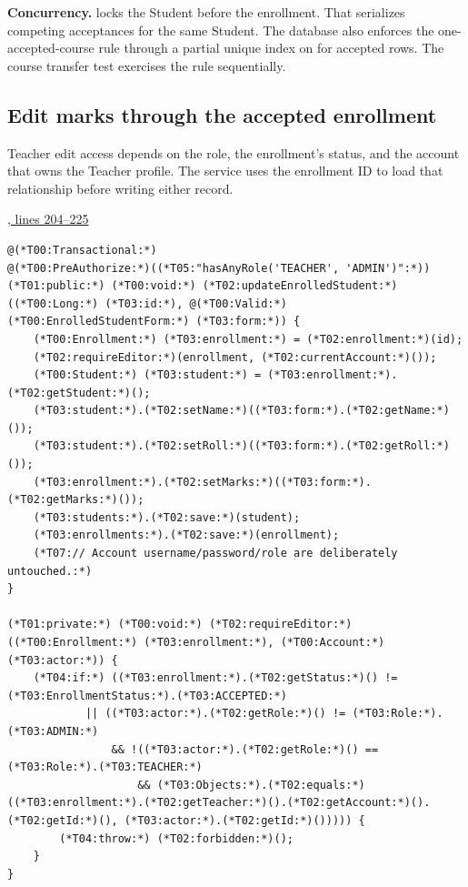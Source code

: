 \textbf{Concurrency.}
 locks the Student before the enrollment. That serializes
competing acceptances for the same Student. The database also enforces the
one-accepted-course rule through a partial unique index on  for
accepted rows. The course transfer test exercises the rule sequentially.

\clearpage
\subsection{Edit marks through the accepted enrollment}
Teacher edit access depends on the role, the enrollment's status, and the
account that owns the Teacher profile. The service uses the enrollment ID to
load that relationship before writing either record.

\par\smallskip
{\small\href{\repo/blob/5d22aed7f6d4ef1e4c0b0c0dabf2962ba4b47608/src/main/java/com/example/fmschool/service/EnrollmentService.java#L204-L225}{, lines 204--225}}
\begin{lstlisting}[style=vsJava,firstnumber=204]
@(*T00:Transactional:*)
@(*T00:PreAuthorize:*)((*T05:"hasAnyRole('TEACHER', 'ADMIN')":*))
(*T01:public:*) (*T00:void:*) (*T02:updateEnrolledStudent:*)((*T00:Long:*) (*T03:id:*), @(*T00:Valid:*) (*T00:EnrolledStudentForm:*) (*T03:form:*)) {
    (*T00:Enrollment:*) (*T03:enrollment:*) = (*T02:enrollment:*)(id);
    (*T02:requireEditor:*)(enrollment, (*T02:currentAccount:*)());
    (*T00:Student:*) (*T03:student:*) = (*T03:enrollment:*).(*T02:getStudent:*)();
    (*T03:student:*).(*T02:setName:*)((*T03:form:*).(*T02:getName:*)());
    (*T03:student:*).(*T02:setRoll:*)((*T03:form:*).(*T02:getRoll:*)());
    (*T03:enrollment:*).(*T02:setMarks:*)((*T03:form:*).(*T02:getMarks:*)());
    (*T03:students:*).(*T02:save:*)(student);
    (*T03:enrollments:*).(*T02:save:*)(enrollment);
    (*T07:// Account username/password/role are deliberately untouched.:*)
}

(*T01:private:*) (*T00:void:*) (*T02:requireEditor:*)((*T00:Enrollment:*) (*T03:enrollment:*), (*T00:Account:*) (*T03:actor:*)) {
    (*T04:if:*) ((*T03:enrollment:*).(*T02:getStatus:*)() != (*T03:EnrollmentStatus:*).(*T03:ACCEPTED:*)
            || ((*T03:actor:*).(*T02:getRole:*)() != (*T03:Role:*).(*T03:ADMIN:*)
                && !((*T03:actor:*).(*T02:getRole:*)() == (*T03:Role:*).(*T03:TEACHER:*)
                    && (*T03:Objects:*).(*T02:equals:*)((*T03:enrollment:*).(*T02:getTeacher:*)().(*T02:getAccount:*)().(*T02:getId:*)(), (*T03:actor:*).(*T02:getId:*)())))) {
        (*T04:throw:*) (*T02:forbidden:*)();
    }
}
\end{lstlisting}

